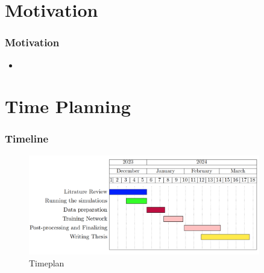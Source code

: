 \documentclass[aspectratio=169]{beamer}
\begin{document}

\section{Motivation}
\begin{frame}
  \frametitle{Motivation}
  \begin{itemize}
    \item 
  \end{itemize}
\end{frame}


\section{Time Planning}
\begin{frame}
  \frametitle{Timeline}
  \begin{center}
    \begin{figure}
      \includegraphics[width=0.9\textwidth]{figs/Timeplan.png}
      \caption{Timeplan}
    \end{figure}
  \end{center} 
\end{frame}

\begin{frame}
  \begin{minipage}{0.1\textwidth}
    \hfill
  \end{minipage}
  \begin{minipage}{0.89\textwidth}
    \\
  \end{minipage}
  
\end{frame}


\end{document}
